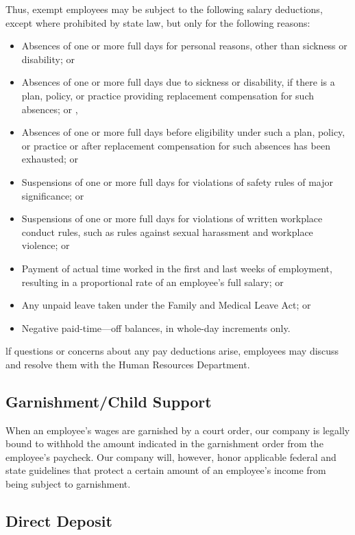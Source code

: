 Thus, exempt employees may be subject to the following salary deductions, except where prohibited by state law, but only for the following reasons:

\begin{itemize} 	
	\item Absences of one or more full days for personal 	reasons, other than sickness or disability; or 	
	\item Absences of one or more full days due to 	sickness or disability, if there is a plan, policy, or 	practice providing replacement compensation for 	such absences; or ,	 
	\item Absences of one or more full days before 	eligibility under such a plan, policy, or practice or 	after replacement compensation for such 	absences has been exhausted; or 	
	\item Suspensions of one or more full days for 	violations of safety rules of major significance; or 	
	\item Suspensions of one or more full days for 	violations of written workplace conduct rules, 	such as rules against sexual harassment and 	workplace violence; or 	
	\item Payment of actual time worked in the first and 	last weeks of employment, resulting in a 	proportional rate of an employee's full salary; or 	
	\item Any unpaid leave taken under the Family and 	Medical Leave Act; or	 	
	\item Negative paid-time—off balances, in whole-day 	increments only. 
\end{itemize}

lf questions or concerns about any pay deductions arise, employees may discuss and resolve them with the Human Resources Department.

\subsection{Garnishment/Child Support}

When an employee's wages are garnished by a court order, our company is legally bound to withhold the amount indicated in the garnishment order from the employee's paycheck. Our company will, however, honor applicable federal and state guidelines that protect a certain amount of an employee's income from being subject to garnishment.

\subsection{Direct Deposit}

